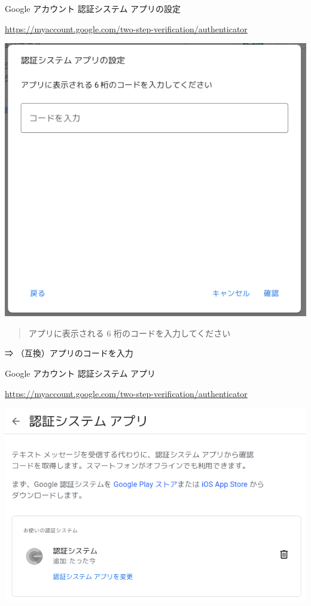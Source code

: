 \begin{frame}{Google アカウント 認証システム アプリの設定}

{\footnotesize\url{https://myaccount.google.com/two-step-verification/authenticator}}

\begin{center}
\includegraphics[width=0.5\hsize]{image202205/g-twostepverif-authenticator-1-3.png}
\end{center}

\begin{quote}
アプリに表示される 6 桁のコードを入力してください
\end{quote}

⇒ （互換）アプリのコードを入力

\end{frame}

\begin{frame}{Google アカウント 認証システム アプリ}

{\footnotesize\url{https://myaccount.google.com/two-step-verification/authenticator}}

\begin{center}
\includegraphics[width=0.8\hsize]{image202205/g-twostepverif-authenticator-2.png}
\end{center}

\begin{quote}
\end{quote}

\end{frame}

